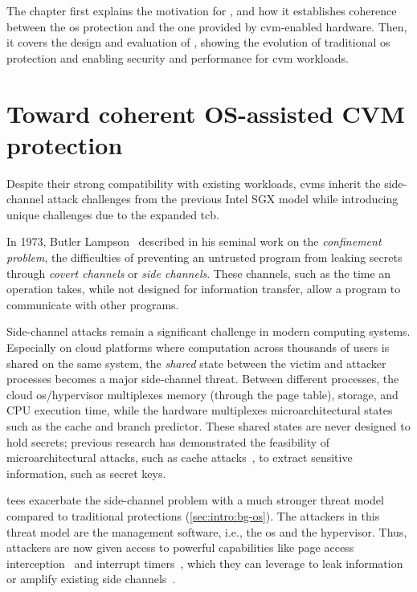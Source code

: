 The chapter first explains the motivation for \incognitos, and how it establishes coherence between the \gls{os} protection and the one provided by \gls{cvm}-enabled hardware.
Then, it covers the design and evaluation of \incognitos, showing the evolution of traditional \gls{os} protection and enabling security and performance for \gls{cvm} workloads.

\clearpage


\section{Toward coherent OS-assisted CVM protection}


Despite their strong compatibility with existing workloads, \glspl{cvm} inherit the side-channel attack challenges from the previous Intel SGX model while introducing unique challenges due to the expanded \gls{tcb}.

In 1973, Butler Lampson~\cite{lampson1973confinement} described in his seminal work on the \emph{confinement problem}, the difficulties of preventing an untrusted program from leaking secrets through \emph{covert channels} or \emph{side channels}.
These channels, such as the time an operation takes, while not designed for information transfer, allow a program to communicate with other programs.



Side-channel attacks remain a significant challenge in modern computing systems.
Especially on cloud platforms where computation across thousands of users is shared on the same system, the \emph{shared} state between the victim and attacker processes becomes a major side-channel threat. 
Between different processes, the cloud \gls{os}/hypervisor multiplexes memory (through the page table), storage, and CPU execution time, while the hardware multiplexes microarchitectural states such as the cache and branch predictor.
These shared states are never designed to hold secrets; previous research has demonstrated the feasibility of microarchitectural attacks, such as cache attacks~\cite{yarom_flushreload_nodate,liu_last-level_2015}, to extract sensitive information, such as secret keys.

\glspl{tee} exacerbate the side-channel problem with a much stronger threat model compared to traditional protections (\cref{sec:intro:bg-os}).
The attackers in this threat model are the management software, i.e., the \gls{os} and the hypervisor. 
Thus, attackers are now given access to powerful capabilities like page access interception~\cite{xu2015controlledchannel} and interrupt timers~\cite{sgx-step,bulck2018nemesis,cachezoom}, which they can leverage to leak information~\cite{xu2015controlledchannel} or amplify existing side channels~\cite{cachezoom,hahnel_high-resolution_2017}.




